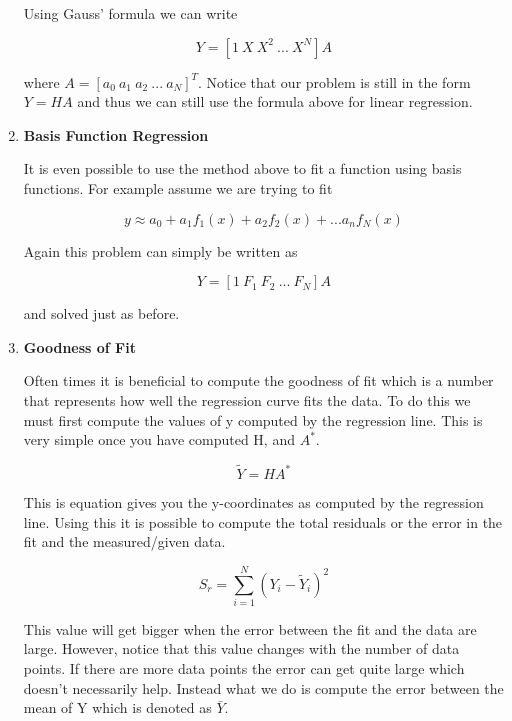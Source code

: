 \begin{enumerate}
Using Gauss' formula we can write

\begin{equation}
Y = [1~X~X^2~...~X^N] A
\end{equation}

where $A = [a_0~a_1~a_2~...~a_N]^T$. Notice that our problem is still
in the form $Y=HA$ and thus we can still use the formula above for
linear regression.

\item {\bf Basis Function Regression}

It is even possible to use the method above to fit a function using
basis functions. For example assume we are trying to fit

\begin{equation}
y \approx a_0 + a_1 f_1(x) + a_2 f_2(x) + ... a_n f_N(x)
\end{equation}

Again this problem can simply be written as 

\begin{equation}
Y = [1~F_1~F_2~...~F_N] A
\end{equation}

and solved just as before.

\item {\bf Goodness of Fit}

Often times it is beneficial to compute the goodness of fit which is a
number that represents how well the regression curve fits the
data. To do this we must first compute the values of y computed by the
regression line. This is very simple once you have computed H, and
$A^*$. 

\begin{equation}
\tilde{Y} = HA^*
\end{equation}

This is equation gives you the y-coordinates as computed by the
regression line. Using this it is possible to compute the total
residuals or the error in the fit and the measured/given data.

\begin{equation}
S_r = \sum\limits_{i=1}^N (Y_i-\tilde{Y}_i)^2
\end{equation}

This value will get bigger when the error between the fit and the data
are large. However, notice that this value changes with the number of
data points. If there are more data points the error can get quite
large which doesn't necessarily help. Instead what we do is compute
the error between the mean of Y which is denoted as $\bar{Y}$.


\end{enumerate}
